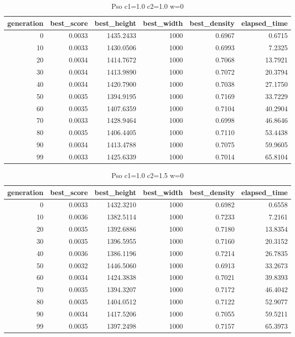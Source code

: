 \begin{table}[htbp]
    \centering
    \caption{Pso c1=1.0 c2=1.0 w=0}
    \label{tab:pso_c1_1_0_c2_1_0_w_0}
    \begin{tabular}{rrrrrr}
    \toprule
    generation & best_score & best_height & best_width & best_density & elapsed_time \\
    \midrule
    0 & 0.0033 & 1435.2433 & 1000 & 0.6967 & 0.6715 \\
    10 & 0.0033 & 1430.0506 & 1000 & 0.6993 & 7.2325 \\
    20 & 0.0034 & 1414.7672 & 1000 & 0.7068 & 13.7921 \\
    30 & 0.0034 & 1413.9890 & 1000 & 0.7072 & 20.3794 \\
    40 & 0.0034 & 1420.7900 & 1000 & 0.7038 & 27.1750 \\
    50 & 0.0035 & 1394.9195 & 1000 & 0.7169 & 33.7229 \\
    60 & 0.0035 & 1407.6359 & 1000 & 0.7104 & 40.2904 \\
    70 & 0.0033 & 1428.9464 & 1000 & 0.6998 & 46.8646 \\
    80 & 0.0035 & 1406.4405 & 1000 & 0.7110 & 53.4438 \\
    90 & 0.0034 & 1413.4788 & 1000 & 0.7075 & 59.9605 \\
    99 & 0.0033 & 1425.6339 & 1000 & 0.7014 & 65.8104 \\
    \bottomrule
    \end{tabular}
\end{table}


\begin{table}[htbp]
    \centering
    \caption{Pso c1=1.0 c2=1.5 w=0}
    \label{tab:pso_c1_1_0_c2_1_5_w_0}
    \begin{tabular}{rrrrrr}
    \toprule
    generation & best_score & best_height & best_width & best_density & elapsed_time \\
    \midrule
    0 & 0.0033 & 1432.3210 & 1000 & 0.6982 & 0.6558 \\
    10 & 0.0036 & 1382.5114 & 1000 & 0.7233 & 7.2161 \\
    20 & 0.0035 & 1392.6886 & 1000 & 0.7180 & 13.8354 \\
    30 & 0.0035 & 1396.5955 & 1000 & 0.7160 & 20.3152 \\
    40 & 0.0036 & 1386.1196 & 1000 & 0.7214 & 26.7835 \\
    50 & 0.0032 & 1446.5060 & 1000 & 0.6913 & 33.2673 \\
    60 & 0.0034 & 1424.3838 & 1000 & 0.7021 & 39.8393 \\
    70 & 0.0035 & 1394.3207 & 1000 & 0.7172 & 46.4042 \\
    80 & 0.0035 & 1404.0512 & 1000 & 0.7122 & 52.9077 \\
    90 & 0.0034 & 1417.5206 & 1000 & 0.7055 & 59.5211 \\
    99 & 0.0035 & 1397.2498 & 1000 & 0.7157 & 65.3973 \\
    \bottomrule
    \end{tabular}
\end{table}


